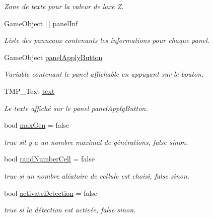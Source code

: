 \begin{DoxyCompactItemize}
\begin{DoxyCompactList}\small\item\em Zone de texte pour la valeur de l\textquotesingle{}axe Z. \end{DoxyCompactList}\item 
Game\+Object \mbox{[}$\,$\mbox{]} \mbox{\hyperlink{class_parameters_a8548a9cf76e7157e3722468f7fa4c275}{panel\+Inf}}
\begin{DoxyCompactList}\small\item\em Liste des panneaux contenants les informations pour chaque panel. \end{DoxyCompactList}\item 
Game\+Object \mbox{\hyperlink{class_parameters_a92c93b0d5d39d8c9eaf80b9aacb6d560}{panel\+Apply\+Button}}
\begin{DoxyCompactList}\small\item\em Variable contenant le panel affichable en appuyant sur le bouton. \end{DoxyCompactList}\item 
T\+M\+P\+\_\+\+Text \mbox{\hyperlink{class_parameters_a872fa6362cb90ff7531c6b6a9dcf38b2}{text}}
\begin{DoxyCompactList}\small\item\em Le texte affiché sur le panel panel\+Apply\+Button. \end{DoxyCompactList}\item 
bool \mbox{\hyperlink{class_parameters_acf7e3f320861b82f33752991e1dc2468}{max\+Gen}} = false
\begin{DoxyCompactList}\small\item\em true s\textquotesingle{}il y a un nombre maximal de générations, false sinon. \end{DoxyCompactList}\item 
bool \mbox{\hyperlink{class_parameters_aeee7bae840964c99195e90c1a0486e46}{rand\+Number\+Cell}} = false
\begin{DoxyCompactList}\small\item\em true si un nombre aléatoire de cellule est choisi, false sinon. \end{DoxyCompactList}\item 
bool \mbox{\hyperlink{class_parameters_ada09985fa2537e0d28f616e0d9b86fb4}{activate\+Detection}} = false
\begin{DoxyCompactList}\small\item\em true si la détection est activée, false sinon. \end{DoxyCompactList}\item 

\end{DoxyCompactItemize}
